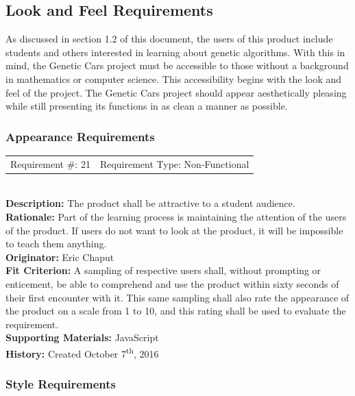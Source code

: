 \documentclass[12pt, titlepage]{article}
\begin{document}
\subsection{Look and Feel Requirements}

As discussed in section 1.2 of this document, the users of this product include 
students and others interested in learning about genetic algorithms. With this 
in mind, the Genetic Cars project must be accessible to those without a 
background in mathematics or computer science. This accessibility begins with 
the look and feel of the project. The Genetic Cars project should appear 
aesthetically pleasing while still presenting its functions in as clean a manner 
as possible.

\subsubsection{Appearance Requirements}

\begin{reqbox}
%
\begin{tabular}{cc}
Requirement \#: 21 & Requirement Type: Non-Functional \\
\end{tabular} \\
%
\textbf{Description:} The product shall be attractive to a student audience. \\
\textbf{Rationale:}  Part of the learning process is maintaining the attention 
of the users of the product. If users do not want to look at the product, it 
will be impossible to teach them anything.\\
\textbf{Originator:} Eric Chaput\\
\textbf{Fit Criterion:} A sampling of respective users shall, without prompting 
or enticement, be able to comprehend and use the product within sixty seconds of 
their first encounter with it. This same sampling shall also rate the appearance 
of the product on a scale from 1 to 10, and this rating shall be used to 
evaluate the requirement.\\
%  
\textbf{Supporting Materials:} JavaScript \\
\textbf{History:} Created October 7\textsuperscript{th}, 2016
%
\end{reqbox}

\newpage

\subsubsection{Style Requirements}
\end{document}

